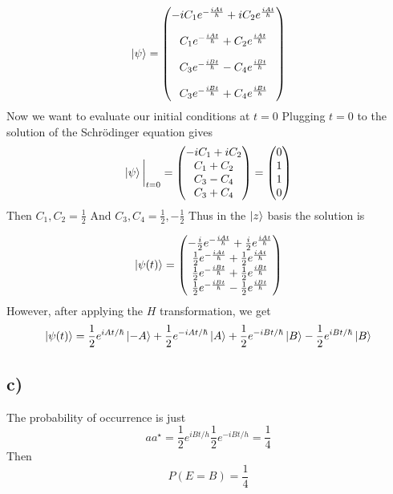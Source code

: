 \documentclass[]{article}
\begin{document}
\[
\ket{\psi}  = 
\begin{pmatrix}
-i C_1 e^{-\frac{iAt}{\hbar}} + i C_2 e^{\frac{iAt}{\hbar}} \\[10pt]
C_1 e^{-\frac{iAt}{\hbar}} + C_2 e^{\frac{iAt}{\hbar}} \\[10pt]
C_3 e^{-\frac{iBt}{\hbar}} - C_4 e^{\frac{iBt}{\hbar}} \\[10pt]
C_3 e^{-\frac{iBt}{\hbar}} + C_4 e^{\frac{iBt}{\hbar}}
\end{pmatrix}
\] Now we want to evaluate our initial conditions at \(t=0\) Plugging
\(t=0\) to the solution of the Schrödinger equation gives \[
\ket{\psi}\bigg|_{t=0} = \begin{pmatrix}
-iC_{1}+iC_{2} \\
C_{1}+C_{2} \\
C_{3}-C_{4} \\
C_{3}+C_{4}
\end{pmatrix} = \begin{pmatrix}
0 \\
1 \\
1 \\
0
\end{pmatrix}
\] Then \(C_{1},C_{2}=\frac{1}{2}\) And
\(C_{3},C_{4} =\frac{1}{2},-\frac{1}{2}\) Thus in the \(\ket{z}\) basis
the solution is

\[
\ket{\psi(t)}  = 
\begin{pmatrix}
-\frac{i}{2} e^{-\frac{iAt}{\hbar}} + \frac{i}{2} e^{\frac{iAt}{\hbar}} \\
\frac{1}{2} e^{-\frac{iAt}{\hbar}} + \frac{1}{2} e^{\frac{iAt}{\hbar}} \\
\frac{1}{2} e^{-\frac{iBt}{\hbar}} + \frac{1}{2} e^{\frac{iBt}{\hbar}} \\
\frac{1}{2} e^{-\frac{iBt}{\hbar}} - \frac{1}{2} e^{\frac{iBt}{\hbar}}
\end{pmatrix}
\] However, after applying the \(H\) transformation, we get \[
\ket{\psi(t)}  = \frac{1}{2}e^{ iAt /\hbar}\ket{-A} +\frac{1}{2}e^{ -iAt /\hbar}\ket{A} +\frac{1}{2}e^{ -iBt /\hbar}\ket{B}-\frac{1}{2}e^{ iBt /\hbar}\ket{B}  
\]

\hypertarget{c-2}{%
\subsection{c)}\label{c-2}}

The probability of occurrence is just \[
aa^{\star} =  \frac{1}{2}e^{ iBt/h } \frac{1}{2}e^{ -iBt/h } = \frac{1}{4}
\] Then \[
P(E=B) = \frac{1}{4}
\]
\end{document}
